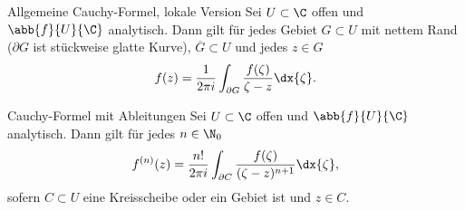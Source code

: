 \begin{karte}{Allgemeine Cauchy-Formel, lokale Version}
    Sei \(U \subset \C\) offen und \(\abb{f}{U}{\C}\) analytisch. Dann gilt für jedes Gebiet 
    \(G \subset U\) mit nettem Rand (\(\partial G\) ist stückweise glatte Kurve), \(\overline{G} \subset U\) 
    und jedes \(z\in G\) 
    \[ f(z) = \frac{1}{2\pi i} \int_{\partial G} \frac{f(\zeta)}{\zeta - z} \dx{\zeta}. \]
\end{karte}

\begin{karte}{Cauchy-Formel mit Ableitungen}
    Sei \(U \subset \C\) offen und \(\abb{f}{U}{\C}\) analytisch. Dann gilt 
    für jedes \(n\in \N_0\) 
    \[ f^{(n)}(z) = \frac{n!}{2\pi i} \int_{\partial C} \frac{f(\zeta)}{(\zeta - z)^{n+1}} \dx{\zeta}, \]
    sofern \(C \subset U\) eine Kreisscheibe oder ein Gebiet ist und \(z\in C\).
\end{karte}